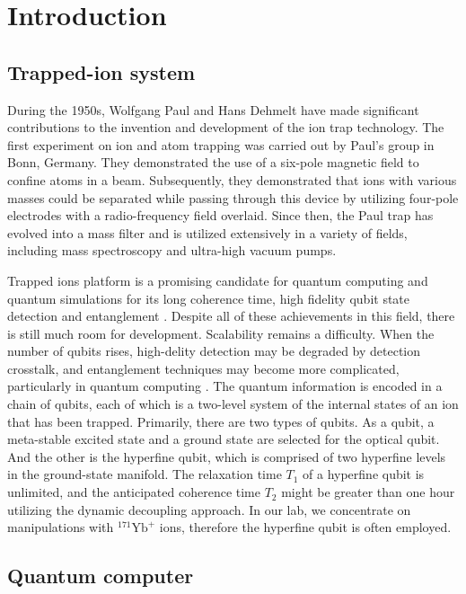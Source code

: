 
\chapter{Introduction}

\section{Trapped-ion system}

During the 1950s, Wolfgang Paul and Hans Dehmelt have made significant contributions to the invention and development of the ion trap technology. The first experiment on ion and atom trapping was carried out by Paul's group in Bonn, Germany. They demonstrated the use of a six-pole magnetic field to confine atoms in a beam. Subsequently, they demonstrated that ions with various masses could be separated while passing through this device by utilizing four-pole electrodes with a radio-frequency field overlaid. Since then, the Paul trap \cite{RevModPhys.62.531} has evolved into a mass filter and is utilized extensively in a variety of fields, including mass spectroscopy and ultra-high vacuum pumps.

Trapped ions platform is a promising candidate for quantum computing and quantum simulations for its long coherence time, high fidelity qubit state detection and entanglement \cite{RN297,RN125}. Despite all of these achievements in this field, there is still much room for development. Scalability remains a difficulty. When the number of qubits rises, high-delity detection may be degraded by detection crosstalk, and entanglement techniques may become more complicated, particularly in quantum computing \cite{RN125}. The quantum information is encoded in a chain of qubits, each of which is a two-level system of the internal states of an ion that has been trapped. Primarily, there are two types of qubits. As a qubit, a meta-stable excited state and a ground state are selected for the optical qubit. And the other is the hyperfine qubit, which is comprised of two hyperfine levels in the ground-state manifold. The relaxation time $T_1$ of a hyperfine qubit is unlimited, and the anticipated coherence time $T_2$ might be greater than one hour utilizing the dynamic decoupling approach. In our lab, we concentrate on manipulations with ${ }^{171} \mathrm{Yb}^{+}$ ions, therefore the hyperfine qubit is often employed.



\section{Quantum computer}

